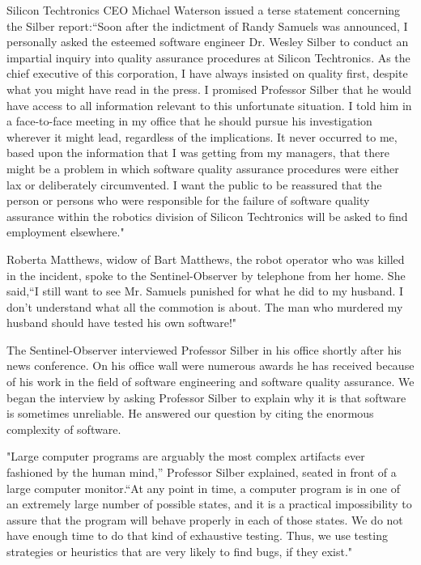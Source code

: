 Silicon Techtronics CEO Michael Waterson issued a terse statement concerning the Silber report:``Soon after the indictment of Randy Samuels was announced, I personally asked the esteemed software engineer Dr. Wesley Silber to conduct an impartial inquiry into quality assurance procedures at Silicon Techtronics. As the chief executive of this corporation, I have always insisted on quality first, despite what you might have read in the press. I promised Professor Silber that he would have access to all information relevant to this unfortunate situation. I told him in a face-to-face meeting in my office that he should pursue his investigation wherever it might lead, regardless of the implications. It never occurred to me, based upon the information that I was getting from my managers, that there might be a problem in which software quality assurance procedures were either lax or deliberately circumvented. I want the public to be reassured that the person or persons who were responsible for the failure of software quality assurance within the robotics division of Silicon Techtronics will be asked to find employment elsewhere."

Roberta Matthews, widow of Bart Matthews, the robot operator who was killed in the incident, spoke to the Sentinel-Observer by telephone from her home. She said,``I still want to see Mr. Samuels punished for what he did to my husband. I don't understand what all the commotion is about. The man who murdered my husband should have tested his own software!"

The Sentinel-Observer interviewed Professor Silber in his office shortly after his news conference. On his office wall were numerous awards he has received because of his work in the field of software engineering and software quality assurance. We began the interview by asking Professor Silber to explain why it is that software is sometimes unreliable. He answered our question by citing the enormous complexity of software.

"Large computer programs are arguably the most complex artifacts ever fashioned by the human mind,'' Professor Silber explained, seated in front of a large computer monitor.``At any point in time, a computer program is in one of an extremely large number of possible states, and it is a practical impossibility to assure that the program will behave properly in each of those states. We do not have enough time to do that kind of exhaustive testing. Thus, we use testing strategies or heuristics that are very likely to find bugs, if they exist."

